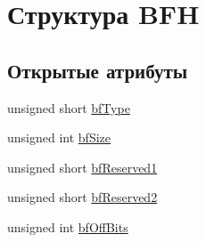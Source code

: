 \hypertarget{struct_b_f_h}{\section{Структура B\+F\+H}
\label{struct_b_f_h}
}
\subsection*{Открытые атрибуты}
\begin{DoxyCompactItemize}
\item 
unsigned short \hyperlink{struct_b_f_h_ada9538ad85cd832a97515f2b6af7e732}{bf\+Type}
\item 
unsigned int \hyperlink{struct_b_f_h_a1c55e1c73aa5af7783c7876c0413023c}{bf\+Size}
\item 
unsigned short \hyperlink{struct_b_f_h_a7f8fa3405df38c43db75c5a67c4d415b}{bf\+Reserved1}
\item 
unsigned short \hyperlink{struct_b_f_h_abcb1c97de35b0a7728541813c2a54365}{bf\+Reserved2}
\item 
unsigned int \hyperlink{struct_b_f_h_a44d5b4c0ff8c1aa71b6d850f084e8369}{bf\+Off\+Bits}
\end{DoxyCompactItemize}


